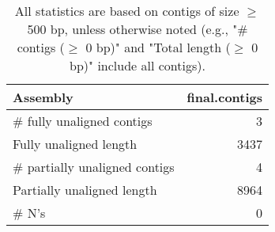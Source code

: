 \documentclass[12pt,a4paper]{article}
\begin{document}
\begin{table}[ht]
\begin{center}
\caption{All statistics are based on contigs of size $\geq$ 500 bp, unless otherwise noted (e.g., "\# contigs ($\geq$ 0 bp)" and "Total length ($\geq$ 0 bp)" include all contigs).}
\begin{tabular}{|l*{1}{|r}|}
\hline
Assembly & final.contigs \\ \hline
\# fully unaligned contigs & 3 \\ \hline
Fully unaligned length & 3437 \\ \hline
\# partially unaligned contigs & 4 \\ \hline
Partially unaligned length & 8964 \\ \hline
\# N's & 0 \\ \hline
\end{tabular}
\end{center}
\end{table}
\end{document}
